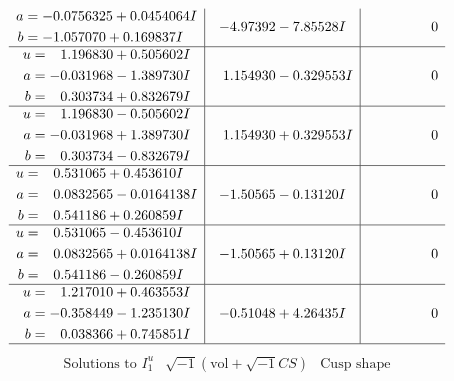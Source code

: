 \documentclass[1p]{elsarticle_modified}
\theoremstyle{definition}
\newcommand{\I}{\sqrt{-1}}
\begin{document}
$$\begin{array}{c|c|c}
\begin{aligned}
a &= -0.0756325 + 0.0454064 I \\
b &= -1.057070 + 0.169837 I\end{aligned}
 & -4.97392 - 7.85528 I & \phantom{-0.000000 } 0 \\ \hline\begin{aligned}
u &= \phantom{-}1.196830 + 0.505602 I \\
a &= -0.031968 - 1.389730 I \\
b &= \phantom{-}0.303734 + 0.832679 I\end{aligned}
 & \phantom{-}1.154930 - 0.329553 I & \phantom{-0.000000 } 0 \\ \hline\begin{aligned}
u &= \phantom{-}1.196830 - 0.505602 I \\
a &= -0.031968 + 1.389730 I \\
b &= \phantom{-}0.303734 - 0.832679 I\end{aligned}
 & \phantom{-}1.154930 + 0.329553 I & \phantom{-0.000000 } 0 \\ \hline\begin{aligned}
u &= \phantom{-}0.531065 + 0.453610 I \\
a &= \phantom{-}0.0832565 - 0.0164138 I \\
b &= \phantom{-}0.541186 + 0.260859 I\end{aligned}
 & -1.50565 - 0.13120 I & \phantom{-0.000000 } 0 \\ \hline\begin{aligned}
u &= \phantom{-}0.531065 - 0.453610 I \\
a &= \phantom{-}0.0832565 + 0.0164138 I \\
b &= \phantom{-}0.541186 - 0.260859 I\end{aligned}
 & -1.50565 + 0.13120 I & \phantom{-0.000000 } 0 \\ \hline\begin{aligned}
u &= \phantom{-}1.217010 + 0.463553 I \\
a &= -0.358449 - 1.235130 I \\
b &= \phantom{-}0.038366 + 0.745851 I\end{aligned}
 & -0.51048 + 4.26435 I & \phantom{-0.000000 } 0\\
 \hline 
 \end{array}$$\newpage$$\begin{array}{c|c|c}  
\text{Solutions to }I^u_{1}& \I (\text{vol} + \sqrt{-1}CS) & \text{Cusp shape}\\
 \hline 
\begin{aligned}

\end{aligned}
\end{array}$$
\end{document}
